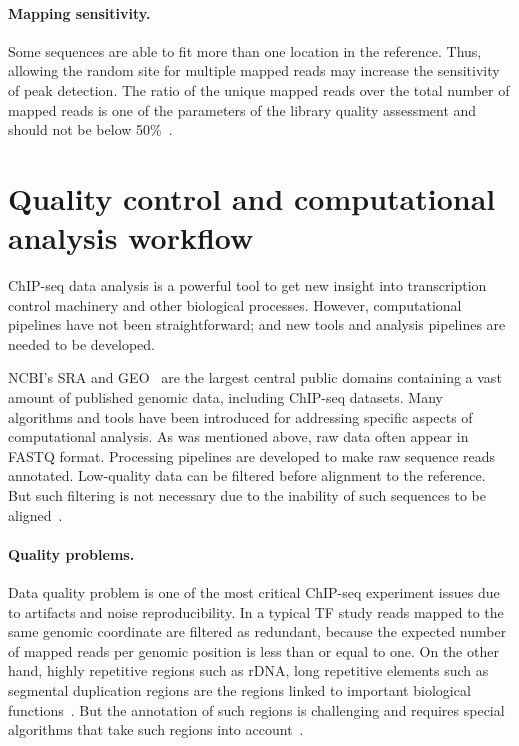 \paragraph{Mapping sensitivity.}
Some sequences are able to fit more than one location in the reference. Thus, allowing the random site for multiple mapped reads may increase the sensitivity of peak detection. 
The ratio of the unique mapped reads over the total number of mapped reads is one of the parameters of the library quality assessment and should not be below 50\%~\cite{shin2013computational}.













\section{Quality control and computational analysis workflow}


ChIP-seq data analysis is a powerful tool to get new insight into transcription control machinery and other biological processes. 
However, computational pipelines have not been straightforward; 
and new tools and analysis pipelines are needed to be developed.

NCBI's SRA and GEO~\cite{barrett2012ncbi} are the largest central public domains containing a vast amount of published genomic data, including ChIP-seq datasets. 
Many algorithms and tools have been introduced for addressing specific aspects of computational analysis. 
As was mentioned above, raw data often appear in FASTQ format. 
Processing pipelines are developed to make raw sequence reads annotated.
Low-quality data can be filtered before alignment to the reference. 
But such filtering is not necessary due to the inability of such sequences to be aligned~\cite{furey2012chip}.


\paragraph{Quality problems.}
Data quality problem is one of the most critical ChIP-seq experiment issues due to artifacts and noise reproducibility.
In a typical TF study reads mapped to the same genomic coordinate are filtered as redundant, because the expected number of mapped reads per genomic position is less than or equal to one. 
On the other hand, highly repetitive regions such as rDNA, long repetitive elements such as segmental duplication regions are the regions linked to important biological functions~\cite{nakato2017recent}. But the annotation of such regions is challenging and requires special algorithms that take such regions into account~\cite{chung2011discovering}.

